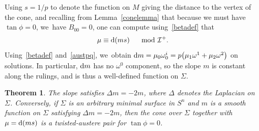 \documentclass[pdftex]{sigma}
\def\calI{\mathcal{I}}
\def\w{\omega}
\newtheorem{Theorem}{Theorem}[section]
\numberwithin{equation}{section}
\begin{document}
Using $s=1/p$ to denote the function on $M$ giving the distance to the vertex of the cone, and recalling from Lemma~\ref{conelemma} that because we must have $\tan \phi = 0$, we~have $B_{00} = 0$, one can compute using~\eqref{betadef} that
\begin{gather*}
\mu \equiv {\rm d}(ms) \quad \mod \calI^+.
\end{gather*}
Using~\eqref{betadef} and~\eqref{austpq}, we~obtain ${\rm d}m = \mu_0 \w^i_0 = p\big(\mu_1 \omega^1 + \mu_2 \omega^2\big)$ on solutions. In particular, ${\rm d}m$ has no $\w^0$ component, so the slope $m$ is constant along the rulings, and is thus a well-defined function on $\Sigma$.

\begin{Theorem}
The slope satisfies $\Delta m =-2m$, where $\Delta$ denotes the Laplacian on $\Sigma$. Conversely, if $\Sigma$ is an arbitrary minimal surface in $S^n$ and $m$ is a smooth function on $\Sigma$ satisfying $\Delta m = -2m$, then the cone over $\Sigma$ together with $\mu = {\rm d}(ms)$ is a twisted-austere pair for $\tan\phi=0$.
\end{Theorem}
\end{document}
